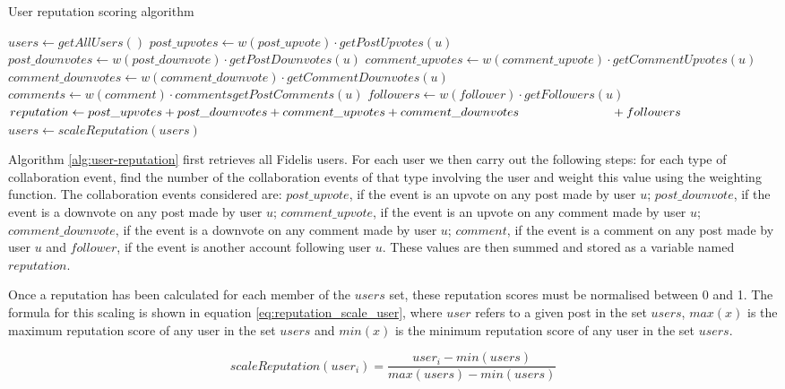 \newcommand{\myindent}[1]{
\newline\makebox[#1cm]{}
}

\begin{algorithm}[H]
\caption{User reputation scoring algorithm}
\label{alg:user-reputation}
\begin{algorithmic}[1]
\State $users\gets getAllUsers()$
	\State $post\_upvotes\gets w(post\_upvote)\cdot getPostUpvotes(u)$
	\State $post\_downvotes\gets w(post\_downvote)\cdot getPostDownvotes(u)$
	\State $comment\_upvotes\gets w(comment\_upvote)\cdot getCommentUpvotes(u)$
	\State $comment\_downvotes\gets w(comment\_downvote)\cdot getCommentDownvotes(u)$
	\State $comments\gets w(comment)\cdot commentsgetPostComments(u)$
	\State $followers\gets w(follower)\cdot getFollowers(u)$
	\State $reputation\gets post\_upvotes + post\_downvotes + comment\_upvotes + comment\_downvotes \myindent{2.6} + followers$
\EndFor
\State $users\gets scaleReputation(users)$
\end{algorithmic}
\end{algorithm}

\noindent
Algorithm \ref{alg:user-reputation} first retrieves all Fidelis users. For each user we then carry out the following steps: for each type of collaboration event, find the number of the collaboration events of that type involving the user and weight this value using the weighting function. The collaboration events considered are: \(post\_upvote\), if the event is an upvote on any post made by user \(u\); \(post\_downvote\), if the event is a downvote on any post made by user \(u\); \(comment\_upvote\), if the event is an upvote on any comment made by user \(u\); \(comment\_downvote\), if the event is a downvote on any comment made by user \(u\); \(comment\), if the event is a comment on any post made by user \(u\) and \(follower\), if the event is another account following user \(u\). These values are then summed and stored as a variable named \(reputation\).

Once a reputation has been calculated for each member of the \(users\) set, these reputation scores must be normalised between 0 and 1. The formula for this scaling is shown in equation \ref{eq:reputation_scale_user}, where \(user\) refers to a given post in the set \(users\), \(max(x)\) is the maximum reputation score of any user in the set \(users\) and \(min(x)\) is the minimum reputation score of any user in the set \(users\).

\begin{equation}
	\label{eq:reputation_scale_user}
	scaleReputation(user_i) = \frac{user_i - min(users)}{max(users) - min(users)}
\end{equation}
